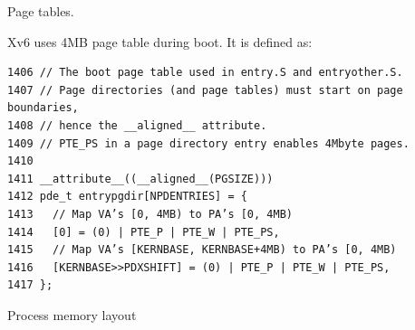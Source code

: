 \documentclass[11pt]{exam}
\begin{document}
\begin{questions}


\newpage
\addpoints

\question Page tables. 


Xv6 uses 4MB page table during boot. It is defined as: 

\begin{verbatim} 
1406 // The boot page table used in entry.S and entryother.S.
1407 // Page directories (and page tables) must start on page boundaries,
1408 // hence the __aligned__ attribute.
1409 // PTE_PS in a page directory entry enables 4Mbyte pages.
1410
1411 __attribute__((__aligned__(PGSIZE)))
1412 pde_t entrypgdir[NPDENTRIES] = {
1413   // Map VA’s [0, 4MB) to PA’s [0, 4MB)
1414   [0] = (0) | PTE_P | PTE_W | PTE_PS,
1415   // Map VA’s [KERNBASE, KERNBASE+4MB) to PA’s [0, 4MB)
1416   [KERNBASE>>PDXSHIFT] = (0) | PTE_P | PTE_W | PTE_PS,
1417 };
\end{verbatim}


\newpage
\addpoints
\question Process memory layout


\end{questions}
\end{document}
